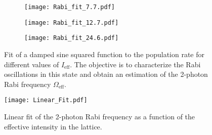 \begin{figure}[!htbp]
	\centering
	\begin{subfigure}{1.\textwidth}
		\centering
		\label{fig:fig:Bragg_fit_1st_order_7.7}
		\texttt{[image: Rabi\_fit\_7.7.pdf]}
	\end{subfigure}%
	\hfill
	\vspace{0.2cm}
	\begin{subfigure}{1.\textwidth}
		\centering
		\label{fig:Bragg_fit_1st_order_12.7}
		\texttt{[image: Rabi\_fit\_12.7.pdf]}
	\end{subfigure}
	\hfill
	\vspace{0.2cm}
	\begin{subfigure}{1.\textwidth}
		\centering
		\label{fig:Bragg_fit_1st_order_24.6}
		\texttt{[image: Rabi\_fit\_24.6.pdf]}
	\end{subfigure}
	\caption[Fit of a damped sine squared function to the population rate for different values of $I_\text{eff}$]{Fit of a damped sine squared function to the population rate for different values of $I_\text{eff}$. The objective is to characterize the Rabi oscillations in this state and obtain an estimation of the 2-photon Rabi frequency $\Omega_\text{eff}$.}
	\label{fig:Bragg_fit_1st_order}
\end{figure}

\begin{figure}[!htbp]\centering
	\texttt{[image: Linear\_Fit.pdf]}
	\caption[Linear fit of the 2-photon Rabi frequency as a function of the effective intensity in the lattice]{Linear fit of the 2-photon Rabi frequency as a function of the effective intensity in the lattice.}\label{fig:Linear_fit}
\end{figure}

\newpage

